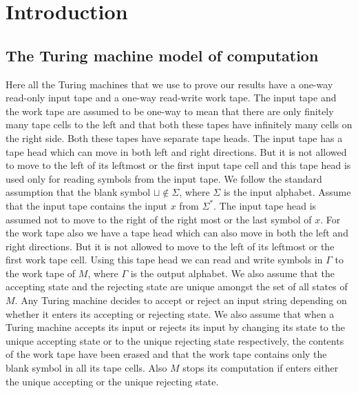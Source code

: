 \documentclass{amsbook}
\theoremstyle{definition}
\theoremstyle{remark}
\numberwithin{section}{chapter}
\numberwithin{equation}{chapter}
\begin{document}
\mainmatter

\chapter{Introduction}\label{chap01-introduction}

\section{The Turing machine model of computation}
Here all the Turing machines that we use to prove our results have a one-way read-only input tape and a one-way read-write work tape. The input tape and the work tape are assumed to be one-way to mean that there are only finitely many tape cells to the left and that both these tapes have infinitely many cells on the right side. Both these tapes have separate tape heads. The input tape has a tape head which can move in both left and right directions. But it is not allowed to move to the left of its leftmost or the first input tape cell and this tape head is used only for reading symbols from the input tape. We follow the standard assumption that the blank symbol $\sqcup\not\in\Sigma$, where $\Sigma$ is the input alphabet. Assume that the input tape contains the input $x$ from $\Sigma^*$. The input tape head is assumed not to move to the right of the right most or the last symbol of $x$. For the work tape also we have a tape head which can also move in both the left and right directions. But it is not allowed to move to the left of its leftmost or the first work tape cell. Using this tape head we can read and write symbols in $\Gamma$ to the work tape of $M$, where $\Gamma$ is the output alphabet. We also assume that the accepting state and the rejecting state are unique amongst the set of all states of $M$. Any Turing machine decides to accept or reject an input string depending on whether it enters its accepting or rejecting state. We also assume that when a Turing machine accepts its input or rejects its input by changing its state to the unique accepting state or to the unique rejecting state respectively, the contents of the work tape have been erased and that the work tape contains only the blank symbol in all its tape cells. Also $M$ stops its computation if enters either the unique accepting or the unique rejecting state.
\end{document}
